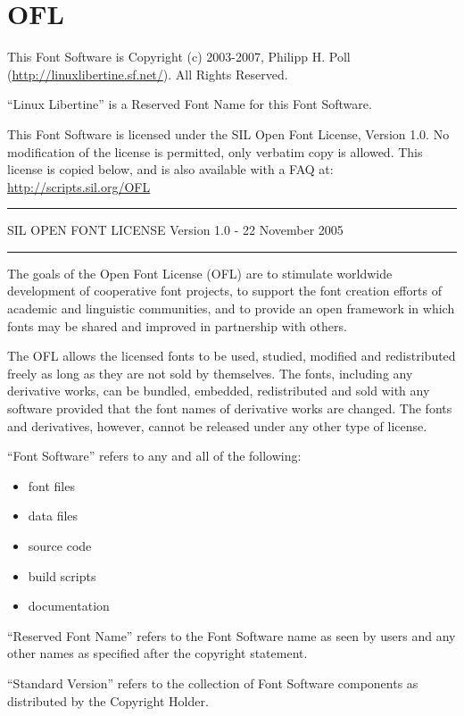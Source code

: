 \documentclass{fontdokuold}
\begin{document}
\section{OFL}

This Font Software is Copyright (c) 2003-2007, Philipp H. Poll (\url{http://linuxlibertine.sf.net/}).
All Rights Reserved.

"`Linux Libertine"' is a Reserved Font Name for this Font Software.

This Font Software is licensed under the SIL Open Font License, Version 1.0.
No modification of the license is permitted, only verbatim copy is allowed.
This license is copied below, and is also available with a FAQ at:
\url{http://scripts.sil.org/OFL}
\bigskip

\hrule\bigskip
SIL OPEN FONT LICENSE Version 1.0 - 22 November 2005\bigskip
\hrule\bigskip


The goals of the Open Font License (OFL) are to stimulate worldwide
development of cooperative font projects, to support the font creation
efforts of academic and linguistic communities, and to provide an open
framework in which fonts may be shared and improved in partnership with
others.

The OFL allows the licensed fonts to be used, studied, modified and
redistributed freely as long as they are not sold by themselves. The
fonts, including any derivative works, can be bundled, embedded,
redistributed and sold with any software provided that the font
names of derivative works are changed. The fonts and derivatives,
however, cannot be released under any other type of license.


"`Font Software"' refers to any and all of the following:
\begin{itemize}
\item font files
\item data files
\item source code
\item build scripts
\item documentation
\end{itemize}

"`Reserved Font Name"' refers to the Font Software name as seen by
users and any other names as specified after the copyright statement.

"`Standard Version"' refers to the collection of Font Software
components as distributed by the Copyright Holder.
\end{document}
